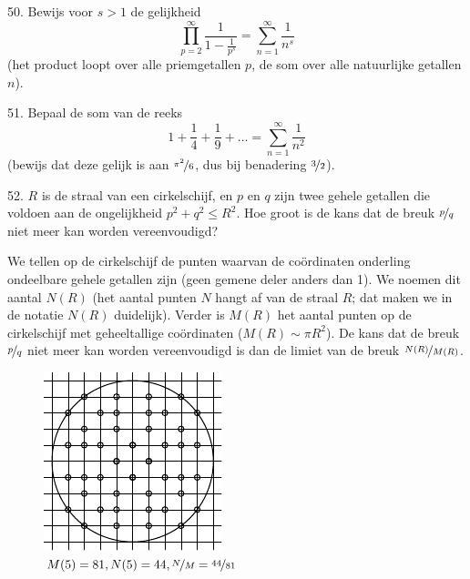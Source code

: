 \begin{problem}{50.}
	Bewijs voor $s > 1$ de gelijkheid
	\begin{equation*}
		\textstyle\prod\limits_{p=2}^{\infty} \frac{1}{1 - \frac{1}{p^s}} = \textstyle\sum\limits_{n=1}^{\infty} \frac{1}{n^s}
	\end{equation*}
	(het product loopt over alle priemgetallen $p$, de som over alle natuur\-lijke getallen $n$).
\end{problem}

\clearpage

\begin{problem}{51.}
	Bepaal de som van de reeks
	\begin{equation*}
		1 + \frac{1}{4} + \frac{1}{9} + \dots = \textstyle\sum\limits_{n=1}^{\infty} \frac{1}{n^2}
	\end{equation*}
	(bewijs dat deze gelijk is aan $\nicefrac{\pi^2}{6}$, dus bij benadering $\nicefrac{3}{2}$).
\end{problem}

\begin{problem}{52.}
	$R$ is de straal van een cirkelschijf, en $p$ en $q$ zijn twee gehele getallen die voldoen aan de ongelijkheid $p^2 + q^2 \leqslant R^2$. Hoe groot is de kans dat de breuk $\nicefrac{p}{q}$ niet meer kan worden vereenvoudigd?

	We tellen op de cirkelschijf de punten waarvan de coördinaten onderling ondeelbare gehele getallen zijn (geen gemene deler anders dan 1). We noemen dit aantal $N(R)$ (het aantal punten $N$ hangt af van de straal $R$; dat maken we in de notatie $N(R)$ duidelijk). Verder is $M(R)$ het aantal punten op de cirkelschijf met geheeltallige coördinaten ($M(R) \sim \pi R^2$). De kans dat de breuk $\nicefrac{p}{q}$ niet meer kan worden vereenvoudigd is dan de limiet van de breuk $\nicefrac{N(R)}{M(R)}$.
	\begin{figure}
		\includegraphics{resources/taskbook-36}\\
		\footnotesize $M(5) = 81,N(5) = 44,\nicefrac{N}{M} = \nicefrac{44}{81}$
	\end{figure}
\end{problem}

